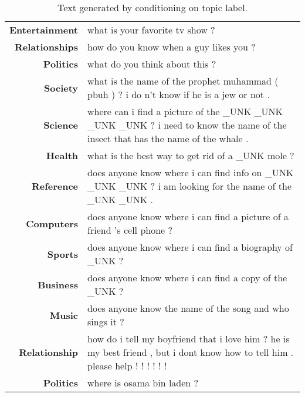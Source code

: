 \documentclass{article}
\begin{document}
\begin{table*}[!thbp]
\begin{tabular}{r  p{12cm}}
    {\bf Entertainment} & what is your favorite tv show ? \\
    {\bf Relationships} & how do you know when a guy likes you ? \\
    {\bf Politics} & what do you think about this ? \\
    \midrule
    {\bf Society} & what is the name of the prophet muhammad ( pbuh ) ? i do n't know if
                    he is a jew or not . \\
    {\bf Science} & where can i find a picture of the \_UNK \_UNK \_UNK \_UNK ? i need to know
                    the name of the insect that has the name of the whale . \\
    {\bf Health} & what is the best way to get rid of a \_UNK mole ?  \\
    {\bf Reference} & does anyone know where i can find info on \_UNK \_UNK \_UNK ? i am
                      looking for the name of the \_UNK \_UNK . \\
    {\bf Computers} & does anyone know where i can find a picture of a friend 's cell
                      phone ? \\
    {\bf Sports} & does anyone know where i can find a biography of \_UNK ? \\
    {\bf Business} & does anyone know where i can find a copy of the \_UNK ? \\
    {\bf Music} & does anyone know the name of the song and who sings it ? \\
    {\bf Relationship} & how do i tell my boyfriend that i love him ? he is my best
                         friend , but i dont know how to tell him . please help ! ! !
                         ! ! ! \\
    {\bf Politics} & where is osama bin laden ? \\
    \bottomrule
  \end{tabular}
  \caption{Text generated by conditioning on topic label.}
  \label{tab:yahoo_sample}
\end{table*}
\end{document}
